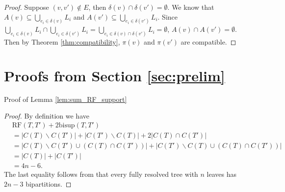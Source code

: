\documentclass{bmcart}
\newcommand{\bs}{\mathrm{bisup}}
\newcommand{\RF}{\mathrm{RF}}
\begin{document}
\begin{proof}
  Suppose $(v,v') \notin E$, then $\delta(v) \cap \delta(v') = \emptyset$. We know that $A(v) \subseteq \bigcup_{e_i \in \delta(v)}L_i$ and $A(v') \subseteq \bigcup_{e_i \in \delta(v')}L_i$. Since $\bigcup_{e_i \in \delta(v)}L_i \cap \bigcup_{e_i\in\delta(v')} L_i = \bigcup_{e_i \in \delta(v) \cap \delta(v')} L_i = \emptyset$, $A(v) \cap A(v') = \emptyset$. Then by Theorem \ref{thm:compatibility}, $\pi(v)$ and $\pi(v')$ are compatible.  

\end{proof}

\appendix
\section{Proofs from Section \ref{sec:prelim}}

Proof of Lemma \ref{lem:sum_RF_support}
\begin{proof}
By definition we have 
  \begin{align*}
    &\RF(T,T')+2\bs(T,T') \\ &= |C(T)\backslash C(T')| + |C(T') \backslash C(T)| + 2|C(T) \cap C(T')| \\
    &= |C(T)\backslash C(T') \cup (C(T) \cap C(T'))| + |C(T') \backslash C(T) \cup (C(T) \cap C(T'))|\\
    &= |C(T)| + |C(T')|\\
    &= 4n-6.
  \end{align*}
  The last equality follows from that every fully resolved tree with $n$ leaves has $2n-3$ bipartitions.
\end{proof}
\end{document}
